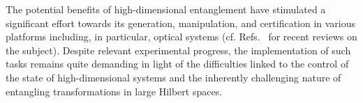 \documentclass[
	aps, pra,
	superscriptaddress, twocolumn,
	floatfix,
	10pt
]{revtex4-1}
\newcommand{\parTitle}[1]{\noindent{\color{Mahogany}(\emph{#1})}}
\newcommand{\commale}[1]{{\textcolor{red} {\it{[Note (Ale): #1]}}}}
\renewcommand{\parTitle}[1]{}
\begin{document}
\parTitle{HD entanglement is challenging, here is what we propose to do in a nutshell} The potential benefits of high-dimensional entanglement have stimulated a significant effort towards its generation, manipulation, and certification in various platforms including, in particular, optical systems (cf. Refs.~\cite{friis2019entanglement, erhard2020advances} for recent reviews on the subject). Despite relevant experimental progress,  the implementation of such tasks remains quite demanding in light of the difficulties linked to the control of the state of high-dimensional systems and the inherently challenging nature of entangling transformations in large Hilbert spaces. 

 

\end{document}
